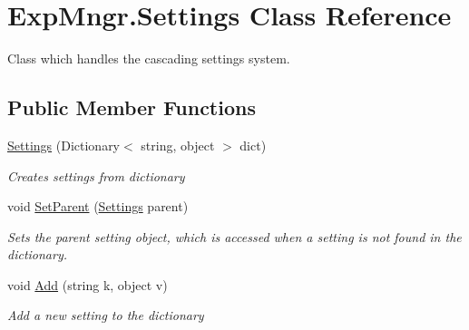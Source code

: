 \hypertarget{class_exp_mngr_1_1_settings}{}\section{Exp\+Mngr.\+Settings Class Reference}
\label{class_exp_mngr_1_1_settings}


Class which handles the cascading settings system.  


\subsection*{Public Member Functions}
\begin{DoxyCompactItemize}
\item 
\hyperlink{class_exp_mngr_1_1_settings_aa0972d4f675ba6bf860f1758ecb5b1fa}{Settings} (Dictionary$<$ string, object $>$ dict)
\begin{DoxyCompactList}\small\item\em Creates settings from dictionary \end{DoxyCompactList}\item 
void \hyperlink{class_exp_mngr_1_1_settings_afa9b02d35179ef8ca30dee3517e6e5bc}{Set\+Parent} (\hyperlink{class_exp_mngr_1_1_settings}{Settings} parent)
\begin{DoxyCompactList}\small\item\em Sets the parent setting object, which is accessed when a setting is not found in the dictionary. \end{DoxyCompactList}\item 
void \hyperlink{class_exp_mngr_1_1_settings_ab573cccea6350b8b58cfd3e350aee41d}{Add} (string k, object v)
\begin{DoxyCompactList}\small\item\em Add a new setting to the dictionary \end{DoxyCompactList}\end{DoxyCompactItemize}
